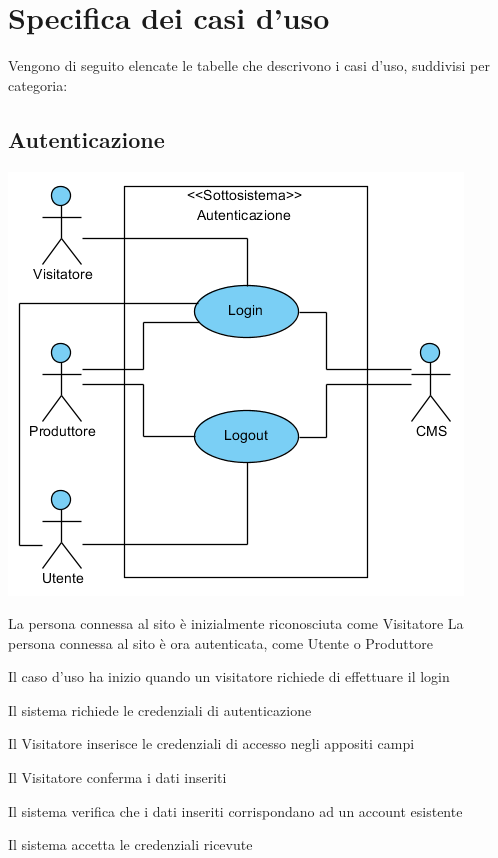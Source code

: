 \section{Specifica dei casi d'uso}
Vengono di seguito elencate le tabelle che descrivono i casi d'uso, suddivisi per categoria:

\subsection{Autenticazione}
\begin{center}
   \includegraphics[width=\textwidth]{assets/visualParadigm/Autenticazione}
\end{center}
%
{}%
{La persona connessa al sito è inizialmente riconosciuta come Visitatore}%
{La persona connessa al sito è ora autenticata, come Utente o Produttore}%
{\begin{enumCU}
	\item Il caso d'uso ha inizio quando un visitatore richiede di effettuare il login 
	\item Il sistema richiede le credenziali di autenticazione 
	\item Il Visitatore inserisce le credenziali di accesso negli appositi campi \label{culogin:3}
	\item Il Visitatore conferma i dati inseriti
	\item Il sistema verifica che i dati inseriti corrispondano ad un account esistente \label{culogin:5}
	\item Il sistema accetta le credenziali ricevute
\end{enumCU}}%
